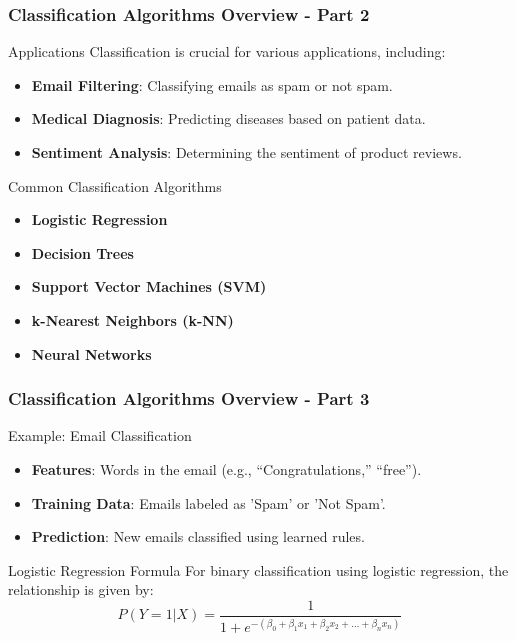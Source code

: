 \documentclass[aspectratio=169]{beamer}
\begin{document}
\begin{frame}[fragile]
    \frametitle{Classification Algorithms Overview - Part 2}
    \begin{block}{Applications}
        Classification is crucial for various applications, including:
        \begin{itemize}
            \item \textbf{Email Filtering}: Classifying emails as spam or not spam.
            \item \textbf{Medical Diagnosis}: Predicting diseases based on patient data.
            \item \textbf{Sentiment Analysis}: Determining the sentiment of product reviews.
        \end{itemize}
    \end{block}
    \begin{block}{Common Classification Algorithms}
        \begin{itemize}
            \item \textbf{Logistic Regression}
            \item \textbf{Decision Trees}
            \item \textbf{Support Vector Machines (SVM)}
            \item \textbf{k-Nearest Neighbors (k-NN)}
            \item \textbf{Neural Networks}
        \end{itemize}
    \end{block}
\end{frame}

\begin{frame}[fragile]
    \frametitle{Classification Algorithms Overview - Part 3}
    \begin{block}{Example: Email Classification}
        \begin{itemize}
            \item \textbf{Features}: Words in the email (e.g., “Congratulations,” “free”).
            \item \textbf{Training Data}: Emails labeled as 'Spam' or 'Not Spam'.
            \item \textbf{Prediction}: New emails classified using learned rules.
        \end{itemize}
    \end{block}
    \begin{block}{Logistic Regression Formula}
        For binary classification using logistic regression, the relationship is given by:
        \begin{equation}
        P(Y = 1 | X) = \frac{1}{1 + e^{-(\beta_0 + \beta_1 x_1 + \beta_2 x_2 + \ldots + \beta_n x_n)}}
        \end{equation}
    \end{block}
\end{frame}
\end{document}
